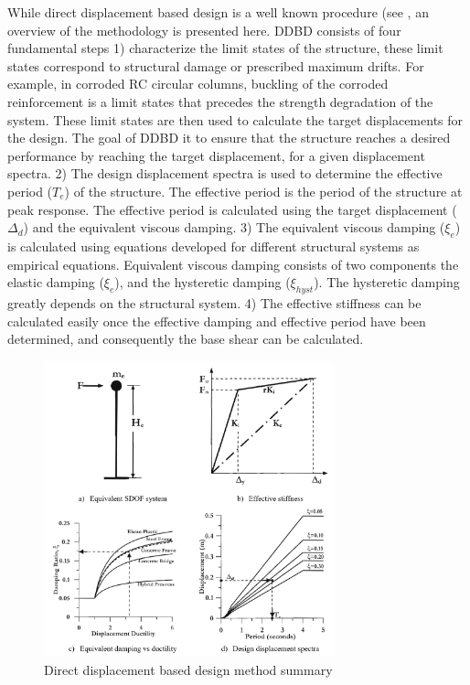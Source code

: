 While direct displacement based design is a well known procedure (see \cite{Priestley2007}, an overview of the methodology is presented here. DDBD consists of four fundamental steps 1) characterize the limit states of the structure, these limit states correspond to structural damage or prescribed maximum drifts. For example, in corroded RC circular columns, buckling of the corroded reinforcement is a limit states that precedes the strength degradation of the system. These limit states are then used to calculate the target displacements for the design. The goal of DDBD it to ensure that the structure reaches a desired performance by reaching the target displacement, for a given displacement spectra. 2) The design displacement spectra is used to determine the effective period ($T_e$) of the structure. The effective period is  the period of the structure at peak response. The effective period is calculated using the target displacement ($\Delta_d$) and the equivalent viscous damping. 3) The equivalent viscous damping ($\xi_e$) is calculated using equations developed for different structural systems as empirical equations. Equivalent viscous damping consists of two components the elastic damping ($\xi_e$), and the hysteretic damping ($\xi_{hyst}$). The hysteretic damping greatly depends on the structural system. 4) The effective stiffness can be calculated easily once the effective damping and effective period have been determined, and consequently the base shear can be calculated. 

\begin{figure}[htbp]
	\centering
	\includegraphics[width=0.75\textwidth]{VAC Prelim 2.0/Chapter-5/figs/DDBD.png}
	\caption{Direct displacement based design method summary \cite{Priestley2007}}
	\label{fig:DDBD_sum}
\end{figure}
\newpage
